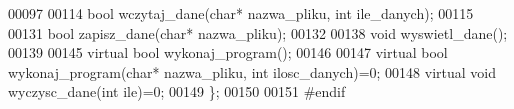 \begin{DoxyCode}
00097 
00114   \textcolor{keywordtype}{bool} wczytaj\_dane(\textcolor{keywordtype}{char}* nazwa\_pliku, \textcolor{keywordtype}{int} ile\_danych);
00115 
00131  \textcolor{keywordtype}{bool} zapisz\_dane(\textcolor{keywordtype}{char}* nazwa\_pliku);
00132 
00138   \textcolor{keywordtype}{void} wyswietl\_dane();
00139 
00145   \textcolor{keyword}{virtual} \textcolor{keywordtype}{bool} wykonaj\_program();
00146 
00147   \textcolor{keyword}{virtual} \textcolor{keywordtype}{bool} wykonaj\_program(\textcolor{keywordtype}{char}* nazwa\_pliku, \textcolor{keywordtype}{int} ilosc\_danych)=0;
00148   \textcolor{keyword}{virtual} \textcolor{keywordtype}{void} wyczysc\_dane(\textcolor{keywordtype}{int} ile)=0;
00149 \};
00150 
00151 \textcolor{preprocessor}{#endif}
\end{DoxyCode}
